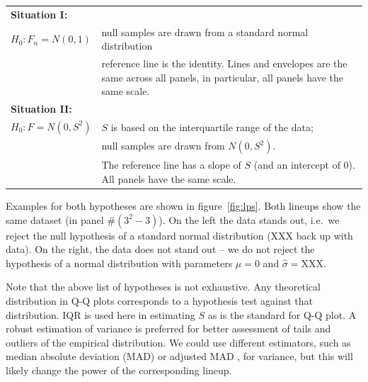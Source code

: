 \documentclass{article}\usepackage[]{graphicx}\usepackage[]{color}
\begin{document}
\begin{tabular}{lp{5.25in}}
\multicolumn{2}{l}{\bf Situation I:}\\
$H_0: F_n = N(0,1)$ & null samples are drawn from a standard normal distribution \\
& reference line is the identity. Lines and envelopes are the same across all panels, in particular, all panels have the same scale. \\[3pt]
\multicolumn{2}{l}{\bf Situation II:}\\
$H_0: F = N(0,S^2)$ & $S$ is based on the interquartile range of the data; \\
& null samples are drawn from $N(0, S^2)$. \\
& The reference line has a slope of $S$ (and an intercept of 0).  All panels have the same scale. 
\end{tabular}
Examples for both hypotheses are shown in figure~\ref{fig:lps}. Both lineups show the same dataset (in panel \#$(3^2-3)$). On the left the data stands out, i.e.~we reject the null hypothesis of a standard normal distribution (XXX back up with data). On the right, the data does not stand out -- we do not reject the hypothesis of a normal distribution with parameters $\mu=0$ and $\widehat{\sigma}=$XXX. 

Note that the above list of hypotheses is not exhaustive. Any theoretical distribution in Q-Q plots corresponds to a  hypothesis test against that distribution. 
IQR is used here in estimating $S$ as is the standard for Q-Q plot. A robust estimation of variance is preferred for better assessment of tails and outliers of the empirical distribution. We could use different estimators, such as median absolute deviation (MAD) or adjusted MAD \citep{rousseeuw}, for variance, but this will likely change the power of the corresponding lineup.
\end{document}
